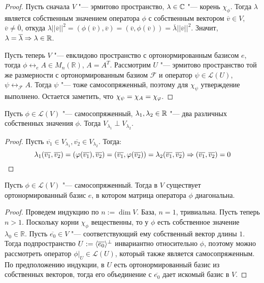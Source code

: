 \begin{proof}
	Пусть сначала $V$ "--- эрмитово пространство, $\lambda \in \Cm$ "--- корень $\chi_\phi$. Тогда $\lambda$ является собственным значением оператора $\phi$ с собственным вектором $\overline{v} \in V$, $\overline{v} \ne \overline{0}$, откуда $\lambda||\overline{v}||^2 = (\phi(\overline{v}), \overline{v}) = (\overline{v}, \phi(\overline{v})) = \overline{\lambda}||\overline{v}||^2$. Значит, $\lambda = \overline\lambda \ra \lambda \in \R$.
	\pagebreak
	
	Пусть теперь $V$ "--- евклидово пространство с ортонормированным базисом $e$, тогда $\phi \leftrightarrow_e A \in M_n(\mathbb{R})$, $A = A^T$. Рассмотрим $U$ "--- эрмитово пространство той же размерности с ортонормированным базиом $\mathcal{F}$ и оператор $\psi \in \mathcal{L}(U)$, $\psi \leftrightarrow_{\mathcal{F}} A$. Тогда $\psi$ "--- тоже самосопряженный, поэтому для $\chi_\psi$ утверждение выполнено. Остается заметить, что $\chi_\psi \hm{=} \chi_A = \chi_\phi$.
\end{proof}

\begin{proposition}
	Пусть $\phi \in \mathcal{L}(V)$ "--- самосопряженный, $\lambda_1, \lambda_2 \hm{\in} \mathbb{R}$ "--- два различных собственных значения $\phi$. Тогда $V_{\lambda_1} \perp V_{\lambda_2}$.
\end{proposition}

\begin{proof}
	Пусть $\overline{v_1} \in V_{\lambda_1}, \overline{v_2} \in V_{\lambda_2}$. Тогда:
	\[\lambda_1(\overline{v_1}, \overline{v_2}) = (\phi(\overline{v_1}), \overline{v_2}) = (\overline{v_1}, \phi(\overline{v_2})) = \lambda_2(\overline{v_1}, \overline{v_2}) \Rightarrow (\overline{v_1}, \overline{v_2}) = 0\qedhere\]
\end{proof}

\begin{theorem}
	Пусть $\phi \in \mathcal{L}(V)$ "--- самосопряженный. Тогда в $V$ существует ортонормированный базис $e$, в котором матрица оператора $\phi$ диагональна.
\end{theorem}

\begin{proof}
	Проведем индукцию по $n := \dim{V}$. База, $n = 1$, тривиальна. Пусть теперь $n > 1$. Поскольку корни $\chi_\phi$ вещественны, то у $\phi$ есть собственное значение $\lambda_0 \in \mathbb{R}$. Пусть $\overline{e_0} \in V$ "--- соответствующий ему собственный вектор длины $1$. Тогда подпространство $U \hm{:=} \langle\overline{e_0}\rangle^\perp$ инвариантно относительно $\phi$, поэтому можно рассмотреть оператор $\phi|_{U} \in \mathcal{L}(U)$, который также является самосопряженным. По предположению индукции, в $U$ есть ортонормированный базис из собственных векторов, тогда его объединение с $\overline{e_0}$ дает искомый базис в $V$.
\end{proof}

